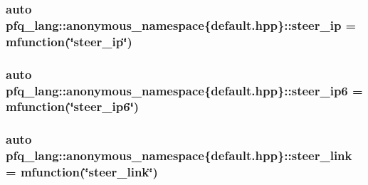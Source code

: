 \hypertarget{namespacepfq__lang_1_1anonymous__namespace_02default_8hpp_03_ab44cbea49db522460c5bce82d04280cd}{
\subsubsection[{steer\+\_\+ip}]{\setlength{\rightskip}{0pt plus 5cm}auto pfq\+\_\+lang\+::anonymous\+\_\+namespace\{default.\+hpp\}\+::steer\+\_\+ip = {\bf mfunction}(\char`\"{}steer\+\_\+ip\char`\"{})}}\label{namespacepfq__lang_1_1anonymous__namespace_02default_8hpp_03_ab44cbea49db522460c5bce82d04280cd}
\hypertarget{namespacepfq__lang_1_1anonymous__namespace_02default_8hpp_03_a011de504f63578469615a302f823d238}{
\subsubsection[{steer\+\_\+ip6}]{\setlength{\rightskip}{0pt plus 5cm}auto pfq\+\_\+lang\+::anonymous\+\_\+namespace\{default.\+hpp\}\+::steer\+\_\+ip6 = {\bf mfunction}(\char`\"{}steer\+\_\+ip6\char`\"{})}}\label{namespacepfq__lang_1_1anonymous__namespace_02default_8hpp_03_a011de504f63578469615a302f823d238}
\hypertarget{namespacepfq__lang_1_1anonymous__namespace_02default_8hpp_03_af339132b49ec24313a1b3d33cefb1628}{
\subsubsection[{steer\+\_\+link}]{\setlength{\rightskip}{0pt plus 5cm}auto pfq\+\_\+lang\+::anonymous\+\_\+namespace\{default.\+hpp\}\+::steer\+\_\+link = {\bf mfunction}(\char`\"{}steer\+\_\+link\char`\"{})}}\label{namespacepfq__lang_1_1anonymous__namespace_02default_8hpp_03_af339132b49ec24313a1b3d33cefb1628}
